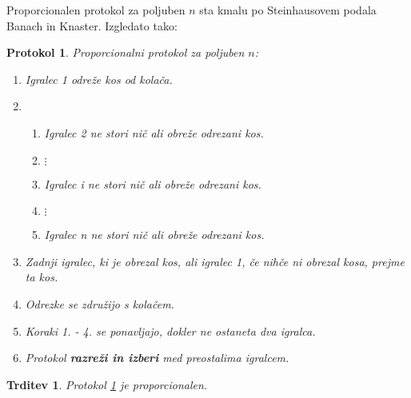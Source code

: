 \documentclass[a4paper, 12pt]{article}
\newtheorem{trditev}{Trditev}
\newtheorem{protokol}{Protokol}
\begin{document}
	Proporcionalen protokol za poljuben $n$ sta kmalu po Steinhausovem podala Banach in Knaster. Izgledato tako:

	\begin{protokol}
		\label{proporcionalni_n}
		Proporcionalni protokol za poljuben $n$:
		\begin{enumerate}
			
			\item Igralec 1 odreže kos od kolača.
			
			\item \begin{enumerate}
							
				\item[(1.)] Igralec 2 ne stori nič ali obreže odrezani kos.
				
				\item[] $\vdots$
				
				\item[(i.)] Igralec i ne stori nič ali obreže odrezani kos.
				
				\item[] $\vdots$
				
				\item[(n.)] Igralec n ne stori nič ali obreže odrezani kos.
				
			\end{enumerate}
		
			\item Zadnji igralec, ki je obrezal kos, ali igralec 1, če nihče ni obrezal kosa, prejme ta kos. 
			
			\item Odrezke se združijo s kolačem.
			
			\item Koraki 1. - 4. se ponavljajo, dokler ne ostaneta dva igralca.
			
			\item Protokol \textbf{razreži in izberi} med preostalima igralcem.
			
		\end{enumerate}
	\end{protokol}

	\begin{trditev}
		Protokol \ref{proporcionalni_n} je proporcionalen.
	\end{trditev}
\end{document}
